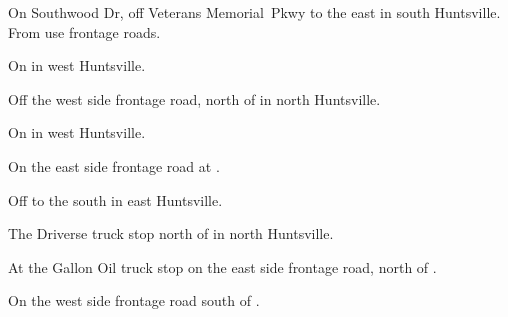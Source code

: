 
\begin{LocationList}

On Southwood Dr, off  Veterans Memorial~Pkwy to the east in south Huntsville.
From  use frontage roads.

On   in west Huntsville.

Off the west side  frontage road, north of  in north Huntsville.

\Location{\RecruitmentAgency \Recruitment}
On   in west Huntsville.

On the east side  frontage road at .

Off  to the south in east Huntsville.

\Location{\TruckStop \Gas \Rest \Service \Weigh}
The Driverse truck stop north of  in north Huntsville.

At the Gallon Oil truck stop on the east side  frontage road, north of .

On the west side  frontage road south of  .

\end{LocationList}
